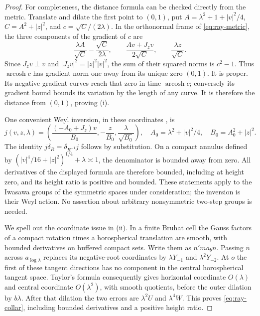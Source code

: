 \begin{proof}
For completeness, the distance formula can be checked directly from the
metric.  Translate and dilate the first point to \((0,1)\), put
\(A=\lambda^2+1+|v|^2/4\), \(C=A^2+|z|^2\), and
\(c=\sqrt C/(2\lambda)\).  In the orthonormal frame of
\eqref{eq:ray-metric}, the three components of the gradient of
\(c\) are
\[
 \frac{\lambda A}{\sqrt C}-\frac{\sqrt C}{2\lambda},\qquad
 \frac{Av+J_zv}{2\sqrt C},\qquad
 \frac{\lambda z}{\sqrt C}.
\]
Since \(J_zv\perp v\) and \(|J_zv|^2=|z|^2|v|^2\), the sum of their
squared norms is \(c^2-1\).  Thus \(\operatorname{arcosh}c\) has gradient norm one
away from its unique zero \((0,1)\).  It is proper.  Its negative
gradient curves reach that zero in time \(\operatorname{arcosh}c\); conversely its
gradient bound bounds its variation by the length of any curve.  It is
therefore the distance from \((0,1)\), proving (i).

One convenient Weyl inversion, in these coordinates \cite[Section~2.4]{Pohl2010}, is
\begin{equation}\label{eq:ray-inversion}
 j(v,z,\lambda)=
 \left(\frac{(-A_0+J_z)v}{B_0},-\frac z{B_0},
             \frac\lambda{\sqrt{B_0}}\right),\quad
 A_0=\lambda^2+|v|^2/4,\quad B_0=A_0^2+|z|^2.
\end{equation}
The identity \(j\delta_R=\delta_{R^{-1}}j\) follows by substitution.
On a compact annulus defined by
\((|v|^4/16+|z|^2)^{1/4}+\lambda\asymp1\), the denominator is bounded
away from zero.  All derivatives of the displayed formula are therefore
bounded, including at height zero, and its height ratio is positive and
bounded.  These statements apply to the Iwasawa groups of the symmetric
spaces under consideration; the inversion is their Weyl action.  No
assertion about arbitrary nonsymmetric two-step groups is needed.

We spell out the coordinate issue in (ii).  In a finite Bruhat cell the
Gauss factors of a compact rotation times a horospherical translation
are smooth, with bounded derivatives on buffered compact sets.  Write
them as \(n'ma_b\bar n\).  Passing \(\bar n\) across \(a_{\log\lambda}\)
replaces its negative-root coordinates by \(\lambda Y_{-1}\) and
\(\lambda^2Y_{-2}\).  At \(o\) the first of these tangent directions
has no component in the central horospherical tangent space.  Taylor's
formula consequently gives horizontal coordinate \(O(\lambda)\) and
central coordinate \(O(\lambda^2)\), with smooth quotients, before the
outer dilation by \(b\lambda\).  After that dilation the two errors are
\(\lambda^2U\) and \(\lambda^4W\).  This proves
\eqref{eq:ray-collar}, including bounded derivatives and a
positive height ratio.


\end{proof}
